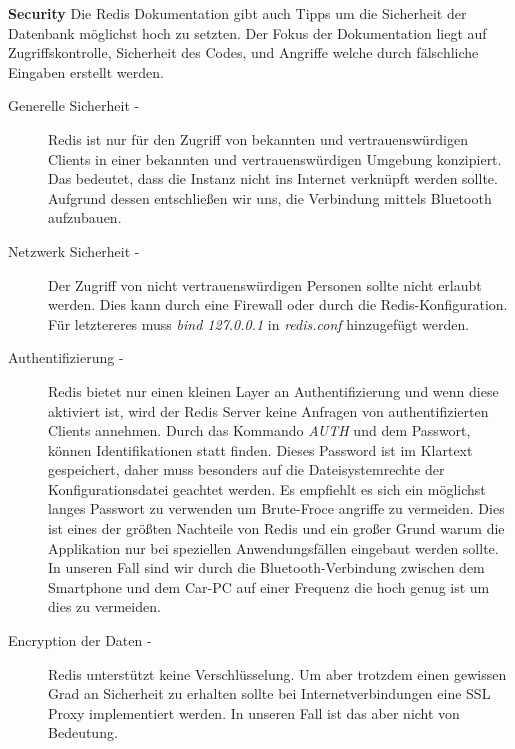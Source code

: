 \textbf{Security\newline}
Die Redis Dokumentation \cite{MELD.CH3-redis.documentation} gibt auch Tipps um die Sicherheit der Datenbank möglichst hoch zu setzten. Der Fokus der Dokumentation liegt auf Zugriffskontrolle, Sicherheit des Codes, und Angriffe welche durch fälschliche Eingaben erstellt werden.

\begin{description}
\item[Generelle Sicherheit - \newline]
Redis ist nur für den Zugriff von bekannten und vertrauenswürdigen Clients in einer bekannten und vertrauenswürdigen Umgebung konzipiert. Das bedeutet, dass die Instanz nicht ins Internet verknüpft werden sollte. Aufgrund dessen entschließen wir uns, die Verbindung mittels Bluetooth aufzubauen.

\item[Netzwerk Sicherheit - \newline]
Der Zugriff von nicht vertrauenswürdigen Personen sollte nicht erlaubt werden. Dies kann durch eine Firewall oder durch die Redis-Konfiguration. Für letztereres muss \textit{bind 127.0.0.1} in \textit{redis.conf} hinzugefügt werden.

\item[Authentifizierung - \newline]
Redis bietet nur einen kleinen Layer an Authentifizierung und wenn diese aktiviert ist, wird der Redis Server keine Anfragen von authentifizierten Clients annehmen. Durch das Kommando \textit{AUTH} und dem Passwort, können Identifikationen statt finden. Dieses Password ist im Klartext gespeichert, daher muss besonders auf die Dateisystemrechte der Konfigurationsdatei geachtet werden. Es empfiehlt es sich ein möglichst langes Passwort zu verwenden um Brute-Froce angriffe zu vermeiden. Dies ist eines der größten Nachteile von Redis und ein großer Grund warum die Applikation nur bei speziellen Anwendungsfällen eingebaut werden sollte. In unseren Fall sind wir durch die Bluetooth-Verbindung zwischen dem Smartphone und dem Car-PC auf einer Frequenz die hoch genug ist um dies zu vermeiden. 

\item[Encryption der Daten - \newline]
Redis unterstützt keine Verschlüsselung. Um aber trotzdem einen gewissen Grad an Sicherheit zu erhalten sollte bei Internetverbindungen eine SSL Proxy implementiert werden. In unseren Fall ist das aber nicht von Bedeutung.


\end{description}

